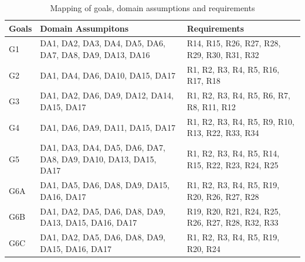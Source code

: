 \begin{table}[ht]

\begin{center}

\begin{tabular}{|p{2cm}|p{4cm}|p{4cm}|}
    
    \toprule
   Goals & Domain Assumpitons & Requirements \\
   \midrule
    G1 & DA1, DA2, DA3, DA4, DA5, DA6, DA7, DA8, DA9, DA13, DA16 & R14, R15, R26, R27, R28, R29, R30, R31, R32 \\ 
    \midrule
    G2 & DA1, DA4, DA6, DA10, DA15, DA17 & R1, R2, R3, R4, R5, R16, R17, R18 \\
    \midrule
    G3 & DA1, DA2, DA6, DA9, DA12, DA14, DA15, DA17 & R1, R2, R3, R4, R5, R6, R7, R8, R11, R12 \\
    \midrule
    G4 & DA1, DA6, DA9, DA11, DA15, DA17 & R1, R2, R3, R4, R5, R9, R10, R13, R22, R33, R34 \\
    \midrule
    G5 & DA1, DA3, DA4, DA5, DA6, DA7, DA8, DA9, DA10, DA13, DA15, DA17 & R1, R2, R3, R4, R5, R14, R15, R22, R23, R24, R25 \\
    \midrule
    G6A & DA1, DA5, DA6, DA8, DA9, DA15, DA16, DA17 & R1, R2, R3, R4, R5, R19, R20, R26, R27, R28 \\
    \midrule
    G6B & DA1, DA2, DA5, DA6, DA8, DA9, DA13, DA15, DA16, DA17 & R19, R20, R21, R24, R25, R26, R27, R28, R32, R33 \\
    \midrule
    G6C & DA1, DA2, DA5, DA6, DA8, DA9, DA15, DA16, DA17 & R1, R2, R3, R4, R5, R19, R20, R24 \\
    \bottomrule
\end{tabular}
\end{center}
\caption{Mapping of goals, domain assumptions and requirements}
\end{table}



